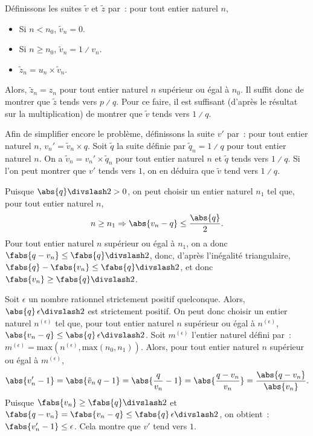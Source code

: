     Définissons les suites $\tilde{v}$ et $\tilde{z}$ par : pour tout entier naturel $n$, 
    \begin{itemize}[nosep]
        \item Si $n < n_0$, $\tilde{v}_n = 0$.
        \item Si $n \geq n_0$, $\tilde{v}_n = 1 \divslash v_n$.
        \item $\tilde{z}_n = u_n \times \tilde{v}_n$.
    \end{itemize}
    Alors, $\tilde{z}_n = z_n$ pour tout entier naturel $n$ supérieur ou égal à $n_0$. 
    Il suffit donc de montrer que $\tilde{z}$ tends vers $p \divslash q$.
    Pour ce faire, il est suffisant (d'après le résultat sur la multiplication) de montrer que $\tilde{v}$ tends vers $1 \divslash q$.

    Afin de simplifier encore le problème, définissons la suite $v'$ par : pour tout entier naturel $n$, $v_n' = \tilde{v}_n \times q$.
    Soit $\tilde{q}$ la suite définie par $\tilde{q}_n = 1 \divslash q$ pour tout entier naturel $n$. 
    On a $\tilde{v}_n = v_n' \times \tilde{q}_n$ pour tout entier naturel $n$ et $\tilde{q}$ tends vers $1 \divslash q$. 
    Si l'on peut montrer que $v'$ tends vers $1$, on en déduira que $\tilde{v}$ tend vers $1 \divslash q$.

    Puisque $\abs{q} \divslash 2 > 0$, on peut choisir un entier naturel $n_1$ tel que, pour tout entier naturel $n$, 
    \begin{equation*}
        n \geq n_1 \Rightarrow \abs{v_n - q} \leq \frac{\abs{q}}{2} .
    \end{equation*}
    Pour tout entier naturel $n$ supérieur ou égal à $n_1$, on a donc $\fabs{q - v_n} \leq \fabs{q} \divslash 2$, donc, d'après l'inégalité triangulaire, $\fabs{q} - \fabs{v_n} \leq \fabs{q} \divslash 2$, et donc $\fabs{v_n} \geq \fabs{q} \divslash 2$. 

    Soit $\epsilon$ un nombre rationnel strictement positif quelconque. 
    Alors, $\abs{q} \, \epsilon \divslash 2$ est strictement positif.
    On peut donc choisir un entier naturel $n^{(\epsilon)}$ tel que, pour tout entier naturel $n$ supérieur ou égal à $n^{(\epsilon)}$, $\abs{v_n - q} \leq \abs{q} \, \epsilon \divslash 2$. 
    Soit $m^{(\epsilon)}$ l'entier naturel défini par : $m^{(\epsilon)} = \mathrm{max} \left( n^{(\epsilon)}, \mathrm{max} \left( n_0, n_1 \right) \right)$. 
    Alors, pour tout entier naturel $n$ supérieur ou égal à $m^{(\epsilon)}$, 
    \begin{equation*}
        \abs{v'_n - 1} 
            = \abs{\tilde{v}_n \, q - 1}
            = \abs{\frac{q}{v_n} - 1}
            = \abs{\frac{q - v_n}{v_n}}
            = \frac{\abs{q - v_n}}{\abs{v_n}} .
    \end{equation*}
    Puisque $\fabs{v_n} \geq \fabs{q} \divslash 2$ et $\fabs{q - v_n} = \fabs{v_n - q} \leq \fabs{q} \, \epsilon \divslash 2$, on obtient : $\fabs{v'_n - 1} \leq \epsilon$.
    Cela montre que $v'$ tend vers $1$.
    
